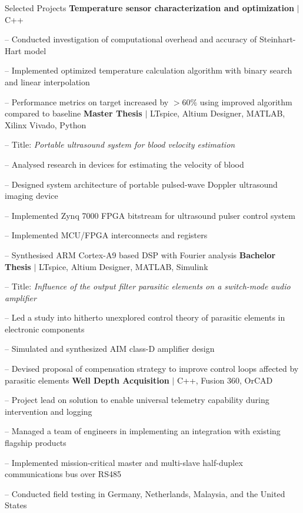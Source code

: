 
\begin{rubric}{\faTasks[solid]  Selected Projects}
\entry*[2024][] \textbf{Temperature sensor characterization and optimization} $|$ C++ \par
	-- Conducted investigation of computational overhead and accuracy of Steinhart-Hart model \par
	-- Implemented optimized temperature calculation algorithm with binary search and linear interpolation \par
	-- Performance metrics on target increased by $>60\%$ using improved algorithm compared to baseline
\entry*[2023][]%
	\textbf{Master Thesis} $|$ LTspice, Altium Designer, MATLAB, Xilinx Vivado, Python \par
	-- Title: \emph{Portable ultrasound system for blood velocity estimation} \par
	-- Analysed research in devices for estimating the velocity of blood \par
	-- Designed system architecture of portable pulsed-wave Doppler ultrasound imaging device \par
	-- Implemented Zynq 7000 FPGA bitstream for ultrasound pulser control system \par
	-- Implemented MCU/FPGA interconnects and registers \par
	-- Synthesised ARM Cortex\textsuperscript{\textcopyright}-A9 based DSP with Fourier analysis
%
\entry*[2020][] \textbf{Bachelor Thesis} $|$ LTspice, Altium Designer, MATLAB, Simulink \par
	-- Title: \emph{Influence of the output filter parasitic elements on a switch-mode audio amplifier} \par
	-- Led a study into hitherto unexplored control theory of parasitic elements in electronic components \par
	-- Simulated and synthesized AIM class-D amplifier design\par
	-- Devised proposal of compensation strategy to improve control loops affected by parasitic elements
%
\entry*[2017][] \textbf{Well Depth Acquisition} $|$ C++, Fusion 360, OrCAD \par
	-- Project lead on solution to enable universal telemetry capability during intervention and logging \par
	-- Managed a team of engineers in implementing an integration with existing flagship products \par
	-- Implemented mission-critical master and multi-slave half-duplex communications bus over RS485 \par
	-- Conducted field testing in Germany, Netherlands, Malaysia, and the United States
%
\end{rubric}